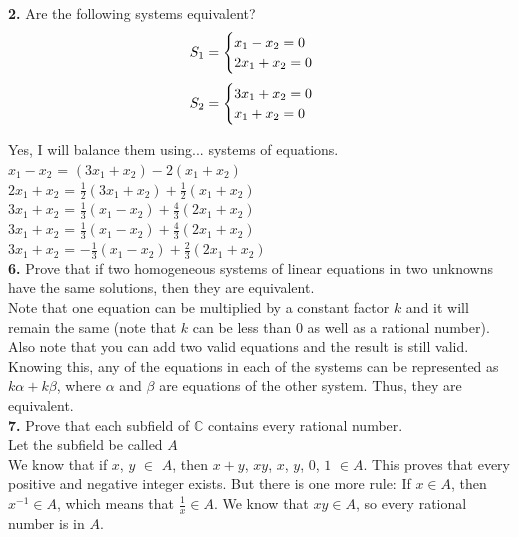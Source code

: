 \documentclass[11pt]{article}
\begin{document}
\textbf{2.}
Are the following systems equivalent?
\begin{equation}
  S_{1} = 
  \begin{cases}
    x_1 - x_2 = 0\\
    2x_1 + x_2 = 0
  \end{cases}\\
\end{equation}
\begin{equation}
  S_{2} = 
  \begin{cases}
    3x_1 + x_2 = 0\\
    x_1 + x_2 = 0
  \end{cases}\\
\end{equation}

Yes, I will balance them using... systems of equations.\\

$x_{1} - x_{2}$ = $(3x_1 + x_2) - 2(x_1 + x_2)$\\

$2x_{1} + x_{2}$ = $\frac{1}{2}(3x_1 + x_2) + \frac{1}{2}(x_1 + x_2)$\\

$3x_{1} + x_{2}$ = $\frac{1}{3}(x_1 - x_2) + \frac{4}{3}(2x_1 + x_2)$\\

$3x_{1} + x_{2}$ = $\frac{1}{3}(x_1 - x_2) + \frac{4}{3}(2x_1 + x_2)$\\

$3x_{1} + x_{2}$ = $-\frac{1}{3}(x_1 - x_2) + \frac{2}{3}(2x_1 + x_2)$\\

\newpage
\textbf{6.}
Prove that if two homogeneous systems of linear equations in two unknowns have the same solutions, then they are equivalent.\\

Note that one equation can be multiplied by a constant factor $k$ and it will remain the same (note that $k$ can be less than 0 as well as a rational number). Also note that you can add two valid equations and the result is still valid. Knowing this, any of the equations in each of the systems can be represented as $k\alpha + k\beta$, where $\alpha$ and $\beta$ are equations of the other system. Thus, they are equivalent.\\

\textbf{7.}
Prove that each subfield of $\mathbb{C}$ contains every rational number.\\

Let the subfield be called $A$\\

We know that if $x$, $y$ $\in$ $A$, then $x + y$, $xy$, $x$, $y$, $0$, $1$ $\in A$. This proves that every positive and negative integer exists. But there is one more rule: If $x \in A$, then $x^{-1} \in A$, which means that $\frac{1}{x} \in A$. We know that $xy \in A$, so every rational number is in $A$.
\end{document}
